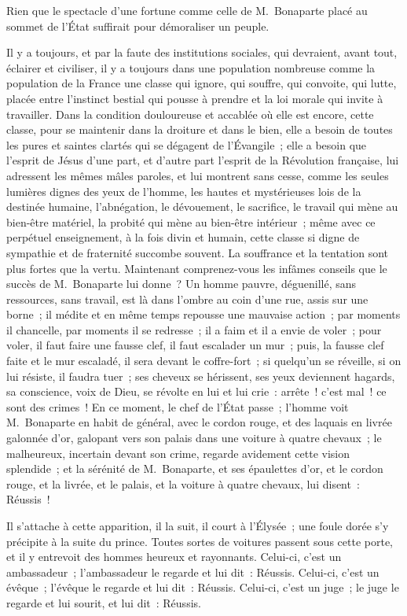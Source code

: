 \documentclass[french,twoside]{book} %
\begin{document}
Rien que le spectacle d’une fortune comme celle de M. Bonaparte placé au sommet de l’État suffirait pour démoraliser un peuple.\par
Il y a toujours, et par la faute des institutions sociales, qui devraient, avant tout, éclairer et civiliser, il y a toujours dans une population nombreuse comme la population de la France une classe qui ignore, qui souffre, qui convoite, qui lutte, placée entre l’instinct bestial qui pousse à prendre et la loi morale qui invite à travailler. Dans la condition douloureuse et accablée où elle est encore, cette classe, pour se maintenir dans la droiture et dans le bien, elle a besoin de toutes les pures et saintes clartés qui se dégagent de l’Évangile ; elle a besoin que l’esprit de Jésus d’une part, et d’autre part l’esprit de la Révolution française, lui adressent les mêmes mâles paroles, et lui montrent sans cesse, comme les seules lumières dignes des yeux de l’homme, les hautes et mystérieuses lois de la destinée humaine, l’abnégation, le dévouement, le sacrifice, le travail qui mène au bien-être matériel, la probité qui mène au bien-être intérieur ; même avec ce perpétuel enseignement, à la fois divin et humain, cette classe si digne de sympathie et de fraternité succombe souvent. La souffrance et la tentation sont plus fortes que la vertu. Maintenant comprenez-vous les infâmes conseils que le succès de M. Bonaparte lui donne ? Un homme pauvre, déguenillé, sans ressources, sans travail, est là dans l’ombre au coin d’une rue, assis sur une borne ; il médite et en même temps repousse une mauvaise action ; par moments il chancelle, par moments il se redresse ; il a faim et il a envie de voler ; pour voler, il faut faire une fausse clef, il faut escalader un mur ; puis, la fausse clef faite et le mur escaladé, il sera devant le coffre-fort ; si quelqu’un se réveille, si on lui résiste, il faudra tuer ; ses cheveux se hérissent, ses yeux deviennent hagards, sa conscience, voix de Dieu, se révolte en lui et lui crie : arrête ! c’est mal ! ce sont des crimes ! En ce moment, le chef de l’État passe ; l’homme voit M. Bonaparte en habit de général, avec le cordon rouge, et des laquais en livrée galonnée d’or, galopant vers son palais dans une voiture à quatre chevaux ; le malheureux, incertain devant son crime, regarde avidement cette vision splendide ; et la sérénité de M. Bonaparte, et ses épaulettes d’or, et le cordon rouge, et la livrée, et le palais, et la voiture à quatre chevaux, lui disent : Réussis !\par
Il s’attache à cette apparition, il la suit, il court à l’Élysée ; une foule dorée s’y précipite à la suite du prince. Toutes sortes de voitures passent sous cette porte, et il y entrevoit des hommes heureux et rayonnants. Celui-ci, c’est un ambassadeur ; l’ambassadeur le regarde et lui dit : Réussis. Celui-ci, c’est un évêque ; l’évêque le regarde et lui dit : Réussis. Celui-ci, c’est un juge ; le juge le regarde et lui sourit, et lui dit : Réussis.\par
\end{document}
